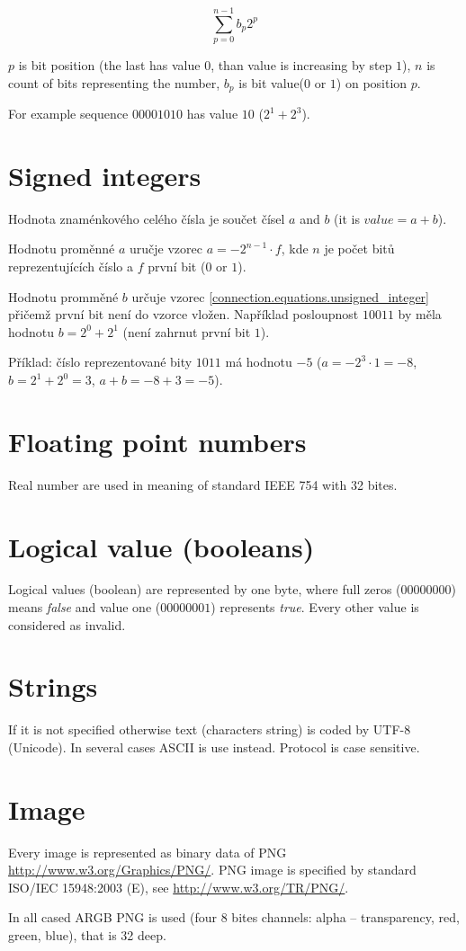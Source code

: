 \begin{equation}
\label{connection.equations.unsigned_integer}
\sum_{p = 0}^{n - 1} b_p 2^p
\end{equation}

$p$ is bit position (the last has value $0$, than value is increasing by step $1$), $n$ is count of bits representing the number, $b_p$ is bit value($0$ or $1$) on position $p$.

For example sequence $00001010$ has value $10$ ($2^1 + 2^3$).

\section{Signed integers}

Hodnota znaménkového celého čísla je součet čísel $a$ and $b$ (it is ${value} = a + b$). 

Hodnotu proměnné $a$ uručje vzorec $a = -2^{n - 1} \cdot f$, kde $n$ je počet bitů reprezentujících číslo a $f$ první bit ($0$ or $1$).

Hodnotu promměné $b$ určuje vzorec \ref{connection.equations.unsigned_integer} přičemž první bit není do vzorce vložen. Například posloupnost $10011$ by měla hodnotu $b = 2^0 + 2^1$ (není zahrnut první bit $1$).

Příklad: číslo reprezentované bity $1011$ má hodnotu $-5$ ($a = -2^3 \cdot 1 = -8$, $b = 2^1 + 2^0 = 3$, $a + b = -8 + 3 = -5$).

\section{Floating point numbers}

Real number are used in meaning of standard IEEE 754 with 32 bites.

\section{Logical value (booleans)} 

Logical values (boolean) are represented by one byte, where full zeros ($00000000$) means \emph{false} and value one ($00000001$) represents \emph{true}. Every other value is considered as invalid.

\section{Strings}

If it is not specified otherwise text (characters string) is coded by UTF-8 (Unicode). In several cases ASCII is use instead. Protocol is case sensitive. 

\section{Image}
\label{connection.data_types.image}

Every image is represented as binary data of PNG \url{http://www.w3.org/Graphics/PNG/}. PNG image is specified by standard ISO/IEC 15948:2003 (E), see \url{http://www.w3.org/TR/PNG/}.

In all cased ARGB PNG is used (four 8 bites channels: alpha -- transparency, red, green, blue), that is 32 deep.